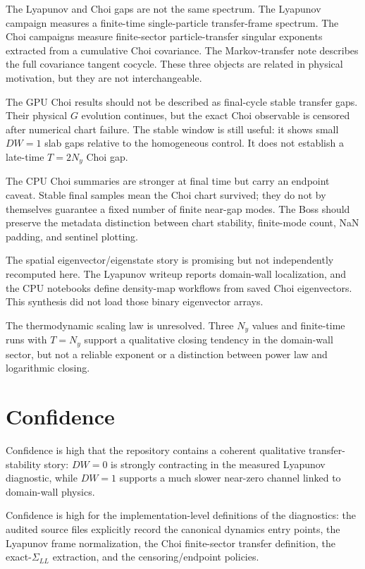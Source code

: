 \documentclass[aps,prb,onecolumn,nofootinbib,superscriptaddress]{revtex4-2}
\newcommand{\SigmaLL}{\Sigma_{LL}}
\begin{document}
The Lyapunov and Choi gaps are not the same spectrum.  The Lyapunov campaign
measures a finite-time single-particle transfer-frame spectrum.  The Choi
campaigns measure finite-sector particle-transfer singular exponents extracted
from a cumulative Choi covariance.  The Markov-transfer note describes the
full covariance tangent cocycle.  These three objects are related in physical
motivation, but they are not interchangeable.

The GPU Choi results should not be described as final-cycle stable transfer
gaps.  Their physical \(G\) evolution continues, but the exact Choi observable
is censored after numerical chart failure.  The stable window is still useful:
it shows small \(DW=1\) slab gaps relative to the homogeneous control.  It does
not establish a late-time \(T=2N_y\) Choi gap.

The CPU Choi summaries are stronger at final time but carry an endpoint caveat.
Stable final samples mean the Choi chart survived; they do not by themselves
guarantee a fixed number of finite near-gap modes.  The Boss should preserve
the metadata distinction between chart stability, finite-mode count, NaN
padding, and sentinel plotting.

The spatial eigenvector/eigenstate story is promising but not independently
recomputed here.  The Lyapunov writeup reports domain-wall localization, and
the CPU notebooks define density-map workflows from saved Choi eigenvectors.
This synthesis did not load those binary eigenvector arrays.

The thermodynamic scaling law is unresolved.  Three \(N_y\) values and
finite-time runs with \(T=N_y\) support a qualitative closing tendency in the
domain-wall sector, but not a reliable exponent or a distinction between power
law and logarithmic closing.

\section{Confidence}

Confidence is high that the repository contains a coherent qualitative
transfer-stability story: \(DW=0\) is strongly contracting in the measured
Lyapunov diagnostic, while \(DW=1\) supports a much slower near-zero channel
linked to domain-wall physics.

Confidence is high for the implementation-level definitions of the diagnostics:
the audited source files explicitly record the canonical dynamics entry points,
the Lyapunov frame normalization, the Choi finite-sector transfer definition,
the exact-\(\SigmaLL\) extraction, and the censoring/endpoint policies.
\end{document}
